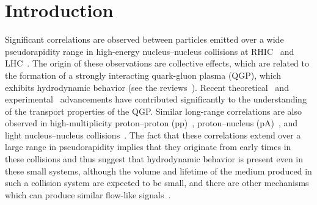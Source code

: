 
\section{Introduction}
\label{sec:intro}

Significant correlations are observed between particles emitted over a wide pseudorapidity range in high-energy nucleus--nucleus collisions at RHIC~\cite{Adams:2005dq,Adcox:2004mh,Arsene:2004fa,Back:2004je} and LHC~\cite{Abelev:2012di, Abelev:2014pua, ATLAS:2011ah}. The origin of these observations are collective effects, which are related to the formation of a strongly interacting quark-gluon plasma (QGP), which exhibits hydrodynamic behavior (see the reviews~\cite{Romatschke:2007mq,Jeon:2015dfa,Romatschke:2017ejr}). Recent theoretical~\cite{Niemi:2015qia,Bernhard:2016tnd,Bernhard:2019bmu,Parkkila:2021tqq,Parkkila:2021yha} and experimental~\cite{ALICE:2016kpq,Acharya:2017gsw,Acharya:2017zfg,Acharya:2020taj} advancements have contributed significantly to the understanding of the transport properties of the QGP.
Similar long-range correlations are also observed in high-multiplicity proton--proton (pp)~\cite{Aad:2015gqa,Khachatryan:2015lva,Khachatryan:2016txc,Acharya:2019vdf}, proton--nucleus (pA)~\cite{Abelev:2012ola,Aad:2014lta,Aaboud:2016yar,Khachatryan:2016ibd}, and light nucleus--nucleus collisions~\cite{PHENIX:2018lia,Aidala:2017ajz}. The fact that these correlations extend over a large range in pseudorapidity implies that they originate from early times in these collisions and thus suggest that hydrodynamic behavior is present even in these small systems, although the volume and lifetime of the medium produced in such a collision system are expected to be small, and there are other mechanisms which can produce similar flow-like signals~\cite{Busza:2018rrf,Nagle:2018nvi}.

